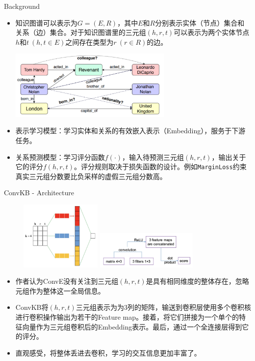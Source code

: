 \begin{frame}[c]{Background}

\begin{itemize}
    \item 知识图谱可以表示为$G=(E,R)$，其中$E$和$R$分别表示实体（节点）集合和关系（边）集合。对于知识图谱里的三元组$(h,r,t)$可以表示为两个实体节点$h$和$t\ (h, t \in E)$之间存在类型为$r\ (r\in R)$的边。\\ 
    \begin{center}
        \includegraphics[width=8cm]{assets/1.png}
    \end{center}
    \item 表示学习模型：学习实体和关系的有效嵌入表示（Embedding），服务于下游任务。
    \item 关系预测模型：学习评分函数$f(\cdot)$，输入待预测三元组$(h,r,t)$，输出关于它的评分$f(h,r,t)$。评分规则取决于损失函数的设计。例如\texttt{MarginLoss}约束真实三元组分数要比负采样的虚假三元组分数高。
\end{itemize}

\end{frame}

\begin{frame}[c]{ConvKB - Architecture}

\begin{figure}
    \centering
    \includegraphics[width=4cm]{assets/7.png}
    \includegraphics[width=5cm]{assets/8.png}
\end{figure}

\begin{itemize}
    \item 作者认为ConvE没有关注到三元组$(h,r,t)$是具有相同维度的整体存在，忽略元组作为整体这一全局信息。
    \item ConvKB将$(h,r,t)$三元组表示为为3列的矩阵，输送到卷积层使用多个卷积核进行卷积操作输出为若干的Feature map。接着，将它们拼接为一个单个的特征向量作为三元组卷积后的Embedding表示。最后，通过一个全连接层得到它的评分。
    \item 直观感受，将整体丢进去卷积，学习的交互信息更加丰富了。
\end{itemize}
    
\end{frame}

